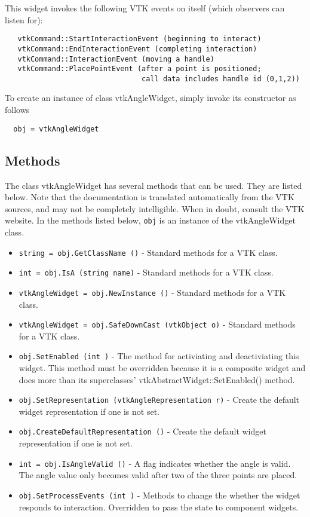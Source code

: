  This widget invokes the following VTK events on itself (which observers
 can listen for):
 \begin{verbatim}
   vtkCommand::StartInteractionEvent (beginning to interact)
   vtkCommand::EndInteractionEvent (completing interaction)
   vtkCommand::InteractionEvent (moving a handle)
   vtkCommand::PlacePointEvent (after a point is positioned; 
                                call data includes handle id (0,1,2))
 \end{verbatim}

To create an instance of class vtkAngleWidget, simply
invoke its constructor as follows
\begin{verbatim}
  obj = vtkAngleWidget
\end{verbatim}
\subsection{Methods}

The class vtkAngleWidget has several methods that can be used.
  They are listed below.
Note that the documentation is translated automatically from the VTK sources,
and may not be completely intelligible.  When in doubt, consult the VTK website.
In the methods listed below, \verb|obj| is an instance of the vtkAngleWidget class.
\begin{itemize}
\item  \verb|string = obj.GetClassName ()| -  Standard methods for a VTK class.

\item  \verb|int = obj.IsA (string name)| -  Standard methods for a VTK class.

\item  \verb|vtkAngleWidget = obj.NewInstance ()| -  Standard methods for a VTK class.

\item  \verb|vtkAngleWidget = obj.SafeDownCast (vtkObject o)| -  Standard methods for a VTK class.

\item  \verb|obj.SetEnabled (int )| -  The method for activiating and deactiviating this widget. This method
 must be overridden because it is a composite widget and does more than
 its superclasses' vtkAbstractWidget::SetEnabled() method.

\item  \verb|obj.SetRepresentation (vtkAngleRepresentation r)| -  Create the default widget representation if one is not set. 

\item  \verb|obj.CreateDefaultRepresentation ()| -  Create the default widget representation if one is not set. 

\item  \verb|int = obj.IsAngleValid ()| -  A flag indicates whether the angle is valid. The angle value only becomes
 valid after two of the three points are placed.

\item  \verb|obj.SetProcessEvents (int )| -  Methods to change the whether the widget responds to interaction.
 Overridden to pass the state to component widgets.

\end{itemize}
